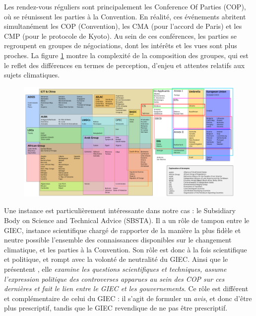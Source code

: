 Les rendez-vous réguliers sont principalement les Conference Of Parties (COP), où se réunissent les parties à la Convention. En réalité, ces événements abritent simultanément les COP (Convention), les CMA (pour l'accord de Paris) et les CMP (pour le protocole de Kyoto). Au sein de ces conférences, les parties se regroupent en groupes de négociations, dont les intérêts et les vues sont plus proches. La figure \ref{fig:COP} montre la complexité de la composition des groupes, qui est le reflet des différences en termes de perception, d'enjeu et attentes relatifs aux sujets climatiques. \\

\begin{figure}
    \centering
    \includegraphics[width=1\linewidth]{figures/UNFCCC_Party_Groupings.svg.png}
    \label{fig:COP}
\end{figure}

Une instance est particulièrement intéressante dans notre cas : le Subsidiary Body on Science and Technical Advice (SBSTA). Il a un rôle de tampon entre le GIEC, instance scientifique chargé de rapporter de la manière la plus fidèle et neutre possible l'ensemble des connaissances disponibles sur le changement climatique, et les parties à la Convention. Son rôle est donc à la fois scientifique et politique, et rompt avec la volonté de neutralité du GIEC. Ainsi que le présentent \cite{aykut_gouverner_nodate}, elle \emph{examine les questions scientifiques et techniques, assume l’expression politique des controverses apparues au sein des COP sur ces dernières et fait le lien entre le GIEC et les gouvernements}. Ce rôle est différent et complémentaire de celui du GIEC : il s'agit de formuler un \emph{avis}, et donc d'être plus prescriptif, tandis que le GIEC revendique de ne pas être prescriptif.  \\




